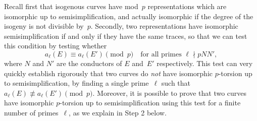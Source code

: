 \documentclass[twoside,leqno,symbols-for-thanks, draft]{rmi}
\numberwithin{equation}{section}
\theoremstyle{remark}
\begin{document}
Recall first that isogenous curves have mod~$p$ representations which
are isomorphic up to semisimplification, and actually isomorphic if
the degree of the isogeny is not divisible by~$p$.  Secondly, two
representations have isomorphic semisimplification if and only if they
have the same traces, so that we can test this condition by testing
whether
\[ a_{\ell}(E)\equiv a_{\ell}(E')\pmod{p}
\quad \text{for all primes } \ell \nmid pNN',
\] 
where $N$ and $N'$ are the conductors of $E$
and~$E'$ respectively.  This test can very quickly establish rigorously
that two curves do \emph{not} have isomorphic $p$-torsion up to
semisimplification, by finding  a single
prime~$\ell$ such that $a_{\ell}(E)\not\equiv a_{\ell}(E')\pmod{p}$.
Moreover, it is possible to prove that two curves have isomorphic $p$-torsion up to
semisimplification using this test for a finite number of
primes~$\ell$, as we explain in Step 2 below.
\end{document}
